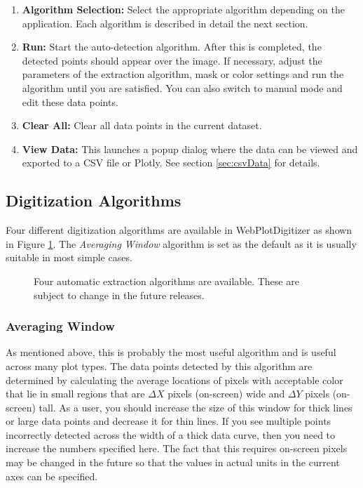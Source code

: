 \documentclass[letterpaper, 11pt]{article}
\begin{document}
\begin{enumerate}
\begin{enumerate}
\end{enumerate}
\item{{\bf Algorithm Selection: }Select the appropriate algorithm depending on the application. Each algorithm is described in detail the next section.}
\item{{\bf Run: }Start the auto-detection algorithm. After this is completed, the detected points should appear over the image. If necessary, adjust the parameters of the extraction algorithm, mask or color settings and run the algorithm until you are satisfied. You can also switch to manual mode and edit these data points.}
\item{{\bf Clear All: }Clear all data points in the current dataset.}
\item{{\bf View Data: }This launches a popup dialog where the data can be viewed and exported to a CSV file or Plotly. See section \ref{sec:csvData} for details.}
\end{enumerate}

\subsection{Digitization Algorithms}
Four different digitization algorithms are available in WebPlotDigitizer as shown in Figure \ref{fig:autoExtractAlgos}. The \emph{Averaging Window} algorithm is set as the default as it is usually suitable in most simple cases.
\begin{figure}
\begin{center}
\caption{Four automatic extraction algorithms are available. These are subject to change in the future releases.}
\label{fig:autoExtractAlgos}
\end{center}
\end{figure}
\subsubsection{Averaging Window}
As mentioned above, this is probably the most useful algorithm and is useful across many plot types. The data points detected by this algorithm are determined by calculating the average locations of pixels with acceptable color that lie in small regions that are $\Delta X$ pixels (on-screen) wide and $\Delta Y$ pixels (on-screen) tall. As a user, you should increase the size of this window for thick lines or large data points and decrease it for thin lines. If you see multiple points incorrectly detected across the width of a thick data curve, then you need to increase the numbers specified here. The fact that this requires on-screen pixels may be changed in the future so that the values in actual units in the current axes can be specified.
\end{document}
